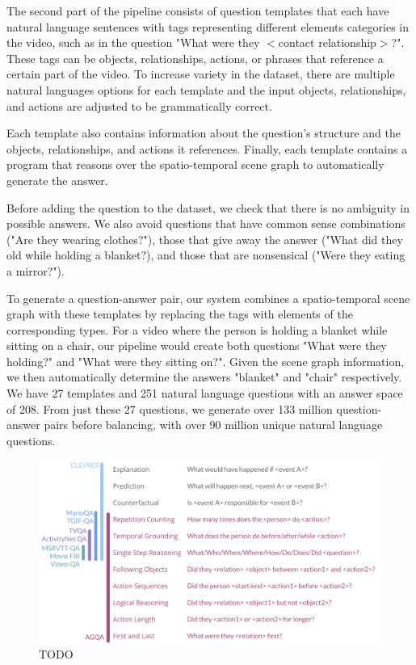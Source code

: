 \documentclass[10pt,twocolumn,letterpaper]{article}
\begin{document}
The second part of the pipeline consists of question templates that each have natural language sentences with tags representing different elements categories in the video, such as in the question "What were they $<$contact relationship$>$?". These tags can be objects, relationships, actions, or phrases that reference a certain part of the video. To increase variety in the dataset, there are multiple natural languages options for each template and the input objects, relationships, and actions are adjusted to be grammatically correct.

Each template also contains information about the question's structure and the objects, relationships, and actions it references. Finally, each template contains a program that reasons over the spatio-temporal scene graph to automatically generate the answer.

Before adding the question to the dataset, we check that there is no ambiguity in possible answers. We also avoid questions that have common sense combinations ("Are they wearing clothes?"), those that give away the answer ("What did they old while holding a blanket?), and those that are nonsensical ("Were they eating a mirror?").

To generate a question-answer pair, our system combines a spatio-temporal scene graph with these templates by replacing the tags with elements of the corresponding types. For a video where the person is holding a blanket while sitting on a chair, our pipeline would create both questions "What were they holding?" and "What were they sitting on?". Given the scene graph information, we then automatically determine the answers "blanket" and "chair" respectively. We have 27 templates and 251 natural language questions with an answer space of 208. From just these 27 questions, we generate over 133 million question-answer pairs before balancing, with over 90 million unique natural language questions.

\begin{figure}[t]
    \centering
    \includegraphics[width=\columnwidth]{figures/questions.pdf}
    \caption{TODO}
    \label{fig:questions}
\end{figure}
\end{document}
